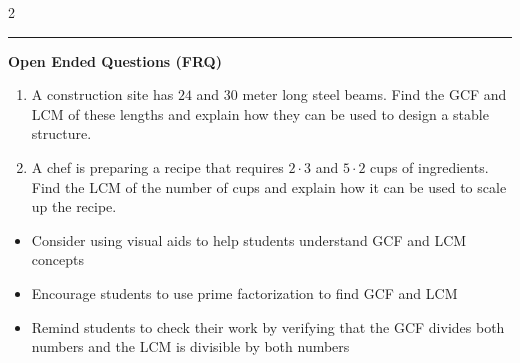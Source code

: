 \documentclass[10pt]{article}
\begin{document}
\begin{multicols}{2}
\begin{enumerate}[label=\textbf{Q\arabic*.}, leftmargin=*, itemsep=6pt, parsep=0pt]
\end{enumerate}
\end{multicols}

\vspace{-0.2cm}
\hrule
\vspace{0.2cm}
\textbf{\small Open Ended Questions (FRQ)}
\begin{enumerate}[label=\textbf{Q\arabic*.}, start=9, itemsep=5pt, topsep=0pt]

  \item \small A construction site has $24$ and $30$ meter long steel beams. Find the GCF and LCM of these lengths and explain how they can be used to design a stable structure. \vspace{2cm}

  \item \small A chef is preparing a recipe that requires $2 \cdot 3$ and $5 \cdot 2$ cups of ingredients. Find the LCM of the number of cups and explain how it can be used to scale up the recipe. \vspace{2cm}

\end{enumerate}

\vfill

\begin{tcolorbox}[colback=blue!5, colframe=mainblue!50, title=\small \textbf{Chef's Tips}, fonttitle=\bfseries, bottom=1mm]
\begin{itemize}[noitemsep, topsep=2pt, leftmargin=0.5cm]
  \item \scriptsize Consider using visual aids to help students understand GCF and LCM concepts\item \scriptsize Encourage students to use prime factorization to find GCF and LCM\item \scriptsize Remind students to check their work by verifying that the GCF divides both numbers and the LCM is divisible by both numbers
\end{itemize}
\end{tcolorbox}
\end{document}
